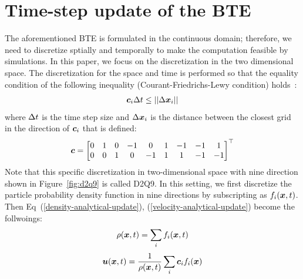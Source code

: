 \section{Time-step update of the BTE}
The aforementioned BTE is formulated in the 
continuous domain; therefore,
we need to discretize sptially and 
temporally to make the computation 
feasible by simulations.
In this paper, we focus on the discretization
in the two dimensional space.
The discretization for the space and time
is performed so that the equality condition of 
the following inequality
(Courant-Friedrichs-Lewy condition) holds~\cite{peyretcomputational, sterling1996stability}:
\begin{equation}
\begin{aligned}
  \boldsymbol{c}_i \Delta t \leq || \Delta \boldsymbol{x}_i ||
\end{aligned}
\end{equation}
where $\Delta t$ is the time step size 
and $\Delta \boldsymbol{x}_i$ is the distance between 
the closest grid in the direction
of $\boldsymbol{c}_i$ that is defined:
\begin{equation}
\begin{aligned}
  \boldsymbol{c} = \begin{bmatrix}
    0 & 1 & 0 & -1 & 0 & 1 & -1 & -1 & 1 \\
    0 & 0 & 1 & 0 & -1 & 1 & 1 & -1 & -1 \\
  \end{bmatrix}^\top
\end{aligned}
\label{d2q9-velocity}
\end{equation}
Note that this specific discretization in two-dimensional
space with nine direction shown in 
Figure~\ref{fig:d2q9} is called D2Q9.
In this setting, 
we first discretize
the particle probability density function
in nine directions by subscripting 
as $f_i(\boldsymbol{x}, t)$.
Then Eq~(\ref{density-analytical-update}), (\ref{velocity-analytical-update})
become the follwoings:
\begin{equation}
  \begin{aligned}
    \rho(\boldsymbol{x}, t) &= \sum_i f_i(\boldsymbol{x}, t) \\
  \end{aligned}
  \label{discretized-density}
\end{equation}
\begin{equation}
\begin{aligned}
  \boldsymbol{u}(\boldsymbol{x}, t) &= 
  \frac{1}{\rho(\boldsymbol{x}, t)} \sum_i \boldsymbol{c}_i f_i(\boldsymbol{x}) \\
\end{aligned}
\label{discretized-velocity}
\end{equation}
